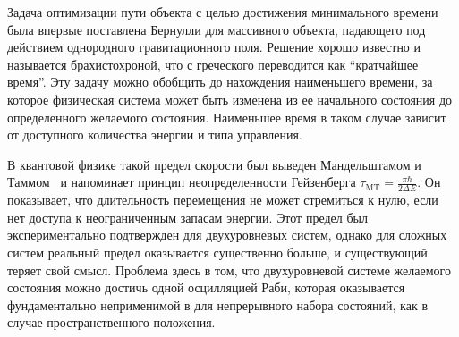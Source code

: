 \documentclass[a4paper, 14pt]{extarticle}
\begin{document}
Задача оптимизации пути объекта с целью достижения минимального времени 
была впервые поставлена Бернулли для массивного объекта, падающего под 
действием однородного гравитационного поля. Решение хорошо известно 
и называется брахистохроной, что с греческого переводится как 
``кратчайшее время''. Эту задачу можно обобщить до нахождения 
наименьшего времени, за которое физическая система может быть изменена 
из ее начального состояния до определенного желаемого состояния. 
Наименьшее время в таком случае зависит от доступного количества энергии 
и типа управления.



В квантовой физике такой предел скорости был выведен Мандельштамом 
и Таммом~\cite{two.one} и напоминает принцип неопределенности 
Гейзенберга $\tau_{\mathrm{MT}} = \frac{\pi\hbar}{2\Delta E}$. Он 
показывает, что длительность перемещения не может стремиться к нулю, 
если нет доступа к неограниченным запасам энергии. Этот предел был 
экспериментально подтвержден для двухуровневых систем, однако для 
сложных систем реальный предел оказывается существенно больше, 
и существующий теряет свой смысл. Проблема здесь в том, что 
двухуровневой системе желаемого состояния можно достичь одной 
осцилляцией Раби, которая оказывается фундаментально неприменимой в для 
непрерывного набора состояний, как в случае пространственного положения.


\end{document}

